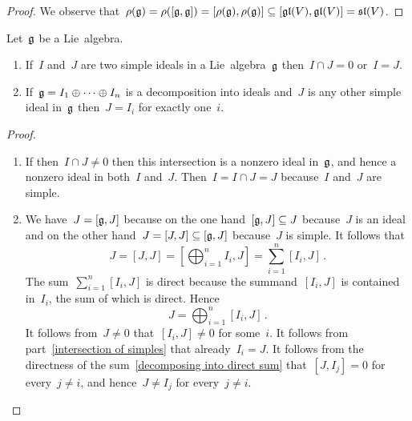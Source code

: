 \begin{proof}
  We observe that~$\rho(\mathfrak{g}) = \rho([\mathfrak{g},\mathfrak{g}]) = [\rho(\mathfrak{g}), \rho(\mathfrak{g})] \subseteq [\mathfrak{gl}(V), \mathfrak{gl}(V)] = \mathfrak{sl}(V)$.
\end{proof}


\begin{lemma}
  \label{properties of simple decompositions}
  Let~$\mathfrak{g}$ be a Lie~algebra.
  \begin{enumerate}
    \item
      \label{intersection of simples}
      If~$I$ and~$J$ are two simple ideals in a Lie~algebra~$\mathfrak{g}$ then~$I \cap J = 0$ or~$I = J$.
    \item
      If~$\mathfrak{g} = I_1 \oplus \dotsb \oplus I_n$ is a decomposition into ideals and~$J$ is any other simple ideal in~$\mathfrak{g}$ then~$J = I_i$ for exactly one~$i$.
  \end{enumerate}
\end{lemma}


\begin{proof}
  \leavevmode
  \begin{enumerate}
    \item
      If then~$I \cap J \neq 0$ then this intersection is a nonzero ideal in~$\mathfrak{g}$, and hence a nonzero ideal in both~$I$ and~$J$.
      Then~$I = I \cap J = J$ because~$I$ and~$J$ are simple.
    \item
      We have~$J = [\mathfrak{g}, J]$ because on the one hand~$[\mathfrak{g}, J] \subseteq J$ because~$J$ is an ideal and on the other hand~$J = [J,J] \subseteq [\mathfrak{g}, J]$ because~$J$ is simple.
      It follows that
      \[
        J
        =
        [J,J]
        =
        \left[ \bigoplus_{i=1}^n I_i, J \right]
        =
        \sum_{i=1}^n [I_i, J] \,.
      \]
      The sum~$\sum_{i=1}^n [I_i, J]$ is direct because the summand~$[I_i, J]$ is contained in~$I_i$, the sum of which is direct.
      Hence
      \begin{equation}
        \label{decomposing into direct sum}
        J
        =
        \bigoplus_{i=1}^n [I_i, J]  \,.
      \end{equation}
      It follows from~$J \neq 0$ that~$[I_i, J] \neq 0$ for some~$i$.
      It follows from part~\ref*{intersection of simples} that already~$I_i = J$.
      It follows from the directness of the sum~\eqref{decomposing into direct sum} that~$[J, I_j] = 0$ for every~$j \neq i$, and hence~$J \neq I_j$ for every~$j \neq i$.
    \qedhere
  \end{enumerate}
\end{proof}


